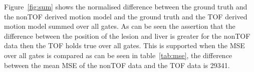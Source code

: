 \documentclass[9pt]{IEEEtran}
\begin{document}
Figure~\ref{fig:sum} shows the normalised difference between the ground truth and the nonTOF derived motion model and the ground truth and the TOF derived motion model summed over all gates. As can be seen the assertion that the difference between the position of the lesion and liver is greater for the nonTOF data then the TOF holds true over all gates. This is supported when the MSE over all gates is compared as can be seen in table~\ref{tab:mse}, the difference between the mean MSE of the nonTOF data and the TOF data is 29341.


%
%

%
%
\end{document}
